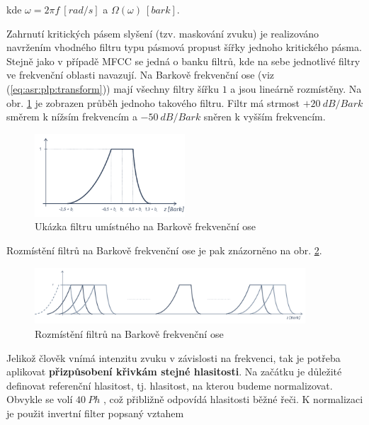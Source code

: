 \noindent kde $\omega = 2\pi f\ \left[rad/s\right]$ a $\Omega\left(\omega\right)\ \left[bark\right]$.

Zahrnutí kritických pásem slyšení (tzv. maskování zvuku) je realizováno navržením vhodného filtru typu pásmová propust šířky jednoho kritického pásma. Stejně jako v případě MFCC se jedná o banku filtrů, kde na sebe jednotlivé filtry ve frekvenční oblasti navazují. Na Barkově frekvenční ose (viz (\ref{eq:asr:plp:transform})) mají všechny filtry šířku $1$ a jsou lineárně rozmístěny. Na obr. \ref{fig:asr:plp:filter} je zobrazen průběh jednoho takového filtru. Filtr má strmost $+20\ dB/Bark$ směrem k nížsím frekvencím a $-50\ dB/Bark$ sněren k vyšším frekvencím.

\begin{figure}[hbpt]
  \centering
  \includegraphics[width=0.5\textwidth]{./ch4-asr/img/plp_filter.pdf}
  \caption{Ukázka filtru umístného na Barkově frekvenční ose}
  \label{fig:asr:plp:filter}
\end{figure}

Rozmístění filtrů na Barkově frekvenční ose je pak znázorněno na obr. \ref{fig:asr:plp:bank}.

\begin{figure}[hbpt]
  \centering
  \includegraphics[width=0.9\textwidth]{./ch4-asr/img/plp-bank.pdf}
  \caption{Rozmístění filtrů na Barkově frekvenční ose}
  \label{fig:asr:plp:bank}
\end{figure}

Jelikož člověk vnímá intenzitu zvuku v závislosti na frekvenci, tak je potřeba aplikovat \textbf{přizpůsobení křivkám stejné hlasitosti}. Na začátku je důležité definovat referenční hlasitost, tj. hlasitost, na kterou budeme normalizovat. Obvykle se volí $40\ Ph$ \cite{Psutka2006}, což přibližně odpovídá hlasitosti běžné řeči. K normalizaci je použit invertní filter popsaný vztahem


